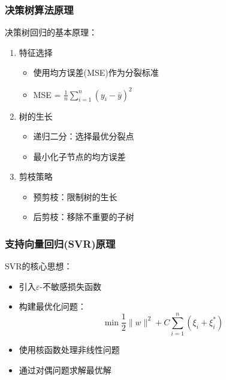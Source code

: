 \subsubsection{决策树算法原理}
决策树回归的基本原理：
\begin{enumerate}
    \item 特征选择
    \begin{itemize}
        \item 使用均方误差(MSE)作为分裂标准
        \item MSE = $\frac{1}{n}\sum_{i=1}^n(y_i - \bar{y})^2$
    \end{itemize}
    
    \item 树的生长
    \begin{itemize}
        \item 递归二分：选择最优分裂点
        \item 最小化子节点的均方误差
    \end{itemize}
    
    \item 剪枝策略
    \begin{itemize}
        \item 预剪枝：限制树的生长
        \item 后剪枝：移除不重要的子树
    \end{itemize}
\end{enumerate}

\subsubsection{支持向量回归(SVR)原理}
SVR的核心思想：
\begin{itemize}
    \item 引入$\varepsilon$-不敏感损失函数
    \item 构建最优化问题：
    \[ \min \frac{1}{2}\|w\|^2 + C\sum_{i=1}^n(\xi_i + \xi_i^*) \]
    \item 使用核函数处理非线性问题
    \item 通过对偶问题求解最优解
\end{itemize}

